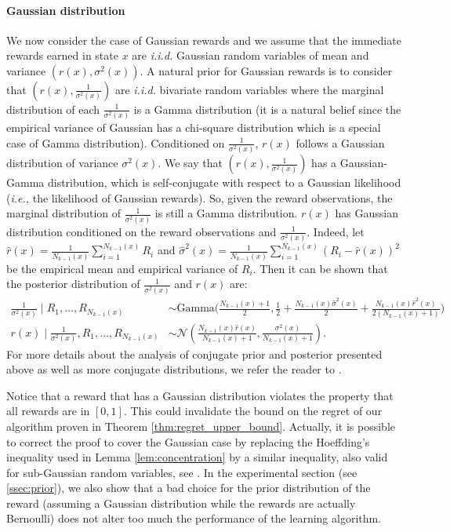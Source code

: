\paragraph{Gaussian distribution}
We now consider the case of Gaussian rewards and we assume that the immediate rewards earned in state $x$ are \emph{i.i.d.} Gaussian random variables of mean and variance $(r(x), \sigma^2(x))$. 
A natural prior for Gaussian rewards is to consider that $(r(x), \frac1{\sigma^2(x)})$ are \emph{i.i.d.} bivariate random variables where the marginal distribution of each $\frac{1}{\sigma^2(x)}$ is a Gamma distribution (it is a natural belief since the empirical variance of Gaussian has a chi-square distribution which is a special case of Gamma distribution). 
Conditioned on $\frac1{\sigma^2(x)}$, $r(x)$ follows a Gaussian distribution of variance $\sigma^2(x)$. 
We say that $(r(x), \frac1{\sigma^2(x)})$ has a Gaussian-Gamma distribution, which is self-conjugate with respect to a Gaussian likelihood (\emph{i.e.,} the likelihood of Gaussian rewards). 
So, given the reward observations, the marginal distribution of $\frac{1}{\sigma^2(x)}$ is still a Gamma distribution. 
$r(x)$ has Gaussian distribution conditioned on the reward observations and $\frac1{\sigma^2(x)}$. 
Indeed, let $\hat{r}(x)=\frac{1}{N_{k-1}(x)}\sum_{i=1}^{N_{k-1}(x)}R_i$ and $\hat{\sigma}^2(x)=\frac{1}{N_{k-1}(x)}\sum_{i=1}^{N_{k-1}(x)}\left(R_i-\hat{r}(x)\right)^2$ be the empirical mean and empirical variance of $R_i$. Then it can be shown that the posterior distribution of $\frac{1}{\sigma^2(x)}$ and $r(x)$ are:
\begin{align*}
    \frac{1}{\sigma^2(x)}\mid R_1,\dots,R_{N_{k-1}(x)}&{\sim} 
    \mathrm{Gamma}\bigg(\frac{N_{k-1}(x){+}1}{2}, \frac{1}{2}{+}\frac{N_{k-1}(x)\hat{\sigma}^2(x)}{2} {+}\frac{N_{k-1}(x)\hat{r}^2(x)}{2(N_{k-1}(x){+}1)}\bigg)\\
    r(x)\mid \frac1{\sigma^2(x)}, R_1,\dots,R_{N_{k-1}(x)}&{\sim} \mathcal{N}\left(\frac{N_{k-1}(x)\hat{r}(x)}{N_{k-1}(x)+1}, \frac{\sigma^2(x)}{N_{k-1}(x)+1}\right).
\end{align*}
For more details about the analysis of conjugate prior and posterior presented above as well as more conjugate distributions, we refer the reader to \cite{fink1997compendium,murphy2007conjugate}.

Notice that a reward that has a Gaussian distribution violates the property that all rewards are in $[0,1]$.
This could invalidate the bound on the regret of our algorithm proven in Theorem \ref{thm:regret_upper_bound}. 
Actually, it is possible to correct the proof to cover the Gaussian case by replacing the Hoeffding's inequality used in Lemma \ref{lem:concentration} by a similar inequality, also valid for sub-Gaussian random variables, see \cite{vershynin2018high}. 
In the experimental section (see \ref{ssec:prior}), we also show that a bad choice for the prior distribution of the reward (assuming a Gaussian distribution while the rewards are actually Bernoulli) does not alter too much the performance of the learning algorithm. 

